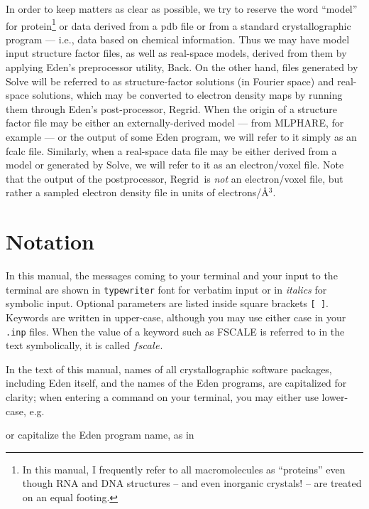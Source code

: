 \documentclass{report}
\begin{document}
In order to keep matters as clear as possible, we try to 
reserve the word ``model''
for protein\footnote {In this manual, I frequently refer to all macromolecules 
as ``proteins'' even though RNA and DNA structures -- and even 
inorganic crystals! -- are treated on an equal footing.}
or data derived from a pdb file or from a standard crystallographic
program --- i.e., data based on chemical information.  Thus we may have model
input structure factor files, as well as real-space models, derived from them
by applying Eden's preprocessor utility, Back.  
On the other hand, files generated by Solve will be
referred to as structure-factor solutions (in Fourier space) and real-space
solutions, which may be converted to electron density maps by running them through
Eden's post-processor, Regrid. 
When the origin of a structure factor file may be either an
externally-derived model --- from MLPHARE, for example --- or the output of
some Eden program, we will refer to it simply as an fcalc file.
Similarly, when a real-space data file may be either derived from a model 
or generated by Solve, we will refer to it as an 
electron/voxel file. Note that the output of the postprocessor, 
Regrid\, is {\em not} an 
electron/voxel file, but rather a sampled
electron density file in units of electrons/\AA$^3$.

\section{Notation}
\label{general-notation}

In this manual, the messages coming to your terminal and your input 
to the terminal are
shown in {\tt typewriter} font for verbatim input or in {\it italics}
for symbolic input.  Optional parameters are listed inside square
brackets {\tt [~]}.  Keywords are written in upper-case, although you
may use either case in your {\tt .inp} files.
When the value of a keyword such as FSCALE is referred
to in the text symbolically, it is called $fscale$.  

\vspace {0.1in}

In the text of this manual, names of all crystallographic software packages,
including Eden itself, and the names of the Eden programs,
are capitalized for clarity;
when entering a command on your terminal, you may either use lower-case, e.g.


or capitalize the Eden program name, as in 
\end{document}
